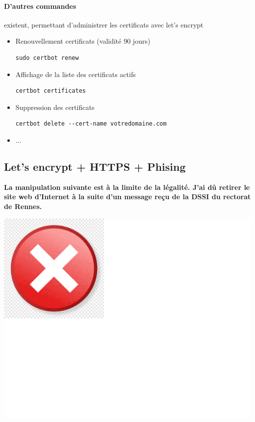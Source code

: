 \documentclass[french, 12pt]{article}%
\newcommand{\itemE}{\item[$\bullet$]}
\begin{document}
\paragraph{D'autres commandes} existent, permettant d'administrer les certificats avec let's encrypt 
\begin{itemize}
\itemE Renouvellement certificats (validité 90 jours)
\begin{lstlisting}[style=commande]
sudo certbot renew
\end{lstlisting}
\itemE Affichage de la liste des certificats actifs 
\begin{lstlisting}[style=commande]
certbot certificates
\end{lstlisting}

\itemE Suppression des certificats
\begin{lstlisting}[style=commande]
certbot delete --cert-name votredomaine.com
\end{lstlisting}
\itemE ...
\end{itemize}


\subsection{Let's encrypt + HTTPS + Phising}


\begin{minipage}[c]{0.6\linewidth}
\textbf{La manipulation suivante est à la limite de la légalité. J'ai dû retirer le site web d'Internet à la suite d'un message reçu de la DSSI du rectorat de Rennes.}
\end{minipage}
\begin{minipage}[c]{0.4\linewidth}
\begin{center}
\includegraphics[scale=0.1]{./ressource/noOK}
\end{center}
\end{minipage}
\end{document}
